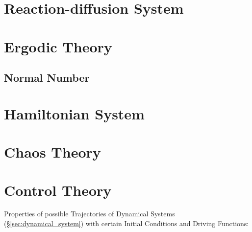 \section{Reaction-diffusion System}\label{sec:reaction_diffusion}

\section{Ergodic Theory}\label{sec:ergodic_theory}

\subsection{Normal Number}\label{sec:normal_number}



\section{Hamiltonian System}\label{sec:hamiltonian_system}

\section{Chaos Theory}\label{sec:chaos_theory}

\section{Control Theory}\label{sec:control_theory}

Properties of possible Trajectories of Dynamical Systems
(\S\ref{sec:dynamical_system}) with certain Initial Conditions and
Driving Functions:

